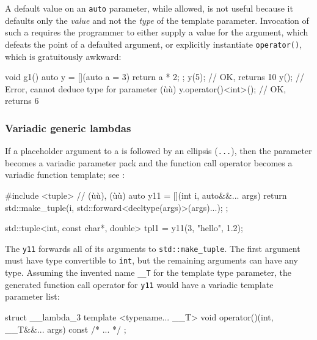 {A default value on an \lstinline!auto! parameter, while allowed, is not
useful because it defaults only the \emph{value} and not the \emph{type}
of the template parameter. Invocation of such a 
requires the programmer to either supply a value for the argument, which
defeats the point of a defaulted argument, or explicitly instantiate
\lstinline!operator()!, which is gratuitously awkward:

\begin{emcppslisting}
void g1()
{
    auto y = [](auto a = 3) { return a * 2; };
    y(5);                // OK, returns 10
    y();                 // Error, cannot deduce type for parameter (ù{}ù)
    y.operator()<int>(); // OK, returns 6
}
\end{emcppslisting}
    

\subsubsection[Variadic generic lambdas]{Variadic generic lambdas}\label{variadic-generic-lambdas}

If a placeholder argument to a  is followed by an
ellipsis (\lstinline!...!), then the parameter becomes a variadic parameter
pack and the function call operator becomes a variadic function
template; see :

\begin{emcppslisting}
#include <tuple>  // (ù{}ù), (ù{}ù)
auto y11 = [](int i, auto&&... args)
{
    return std::make_tuple(i, std::forward<decltype(args)>(args)...);
};

std::tuple<int, const char*, double> tpl1 = y11(3, "hello", 1.2);
\end{emcppslisting}
    

\noindent The \lstinline!y11!  forwards all of its arguments
to \lstinline!std::make_tuple!. The first argument must have type
convertible to \lstinline!int!, but the remaining arguments can have any
type. Assuming the invented name \lstinline!__T! for the template type
parameter, the generated function call operator for \lstinline!y11! would
have a variadic template parameter list:

\begin{emcppslisting}
struct __lambda_3
{
    template <typename... __T> void operator()(int, __T&&... args) const
    {
        /* ... */
    }
};
\end{emcppslisting}
    

}
